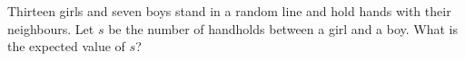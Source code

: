 Thirteen girls and seven boys stand in a random line and hold hands with their neighbours. Let $s$ be the number of handholds between a girl and a boy. What is the expected value of $s$?
